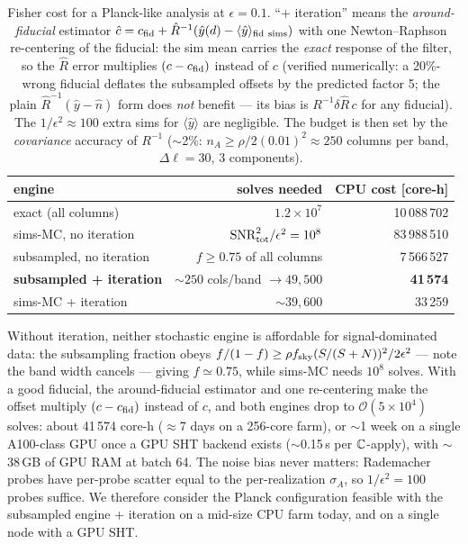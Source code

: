 \begin{table}[h]\centering\small
\begin{tabular}{lrr}
\toprule
engine & solves needed & CPU cost [core-h] \\
\midrule
exact (all columns) & $1.2\times10^7$ & 10\,088\,702 \\
sims-MC, no iteration & $\mathrm{SNR}^2_{\rm tot}/\epsilon^2
  = 10^8$ & 83\,988\,510 \\
subsampled, no iteration & $f\ge0.75$ of all columns &
  7\,566\,527 \\
\textbf{subsampled + iteration} & $\sim250$ cols/band
  $\to 49,500$\hspace{-2mm} & \textbf{41\,574} \\
sims-MC + iteration & $\sim39,600$ & 33\,259 \\
\bottomrule
\end{tabular}
\caption{Fisher cost for a Planck-like analysis at
$\epsilon=0.1$.  ``+ iteration'' means the \emph{around-fiducial}
estimator $\hat c = c_{\rm fid} + \hat R^{-1}(\hat y(d) -
\langle\hat y\rangle_{\rm fid\ sims})$ with one Newton--Raphson
re-centering of the fiducial: the sim mean carries the \emph{exact}
response of the filter, so the $\hat R$ error multiplies
$(c-c_{\rm fid})$ instead of $c$ (verified numerically: a 20\%-wrong
fiducial deflates the subsampled offsets by the predicted factor 5;
the plain $\hat R^{-1}(\hat y-\hat n)$ form does \emph{not}
benefit --- its bias is $R^{-1}\delta\hat R\,c$ for any fiducial).
The $1/\epsilon^2\approx100$ extra sims for
$\langle\hat y\rangle$ are negligible.  The budget is then set by the
\emph{covariance} accuracy of $R^{-1}$ ($\sim$2\%:
$n_A\ge\rho/2(0.01)^2\approx250$ columns per band, $\Delta\ell=30$,
3 components).}
\end{table}

Without iteration, neither stochastic engine is affordable for
signal-dominated data: the subsampling fraction obeys
$f/(1-f)\ge\rho f_{\rm sky}(S/(S+N))^2/2\epsilon^2$ --- note the band
width cancels --- giving $f\simeq0.75$, while sims-MC needs
$10^8$ solves.  With a good fiducial, the around-fiducial estimator and
one re-centering make the offset multiply $(c-c_{\rm fid})$ instead of
$c$, and both engines drop to
$\mathcal{O}(5\times10^4)$ solves: about 41\,574 core-h
($\approx$7 days on a 256-core
farm), or $\sim$1 week on a single A100-class GPU once a GPU SHT backend
exists ($\sim$0.15\,s per $\mathbb{C}$-apply), with $\sim$38\,GB of GPU RAM at
batch 64.  The noise bias never matters: Rademacher probes have
per-probe scatter equal to the per-realization $\sigma_A$, so
$1/\epsilon^2=100$ probes suffice.  We therefore consider the Planck
configuration feasible with the subsampled engine + iteration on a
mid-size CPU farm today, and on a single node with a GPU SHT.

